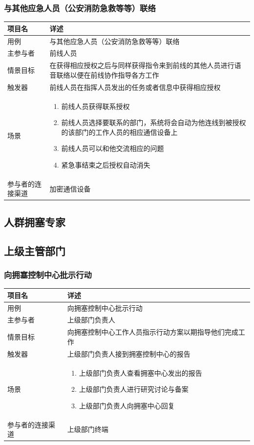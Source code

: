 \documentclass{ctexrep}
\begin{document}
\subsubsection{与其他应急人员（公安消防急救等等）联络}
\begin{longtable}{p{2cm} | p{10cm}}
\hline
项目名 & 详述 \\
\hline
\hline
用例 & 与其他应急人员（公安消防急救等等）联络\\
\hline
主参与者 & 前线人员 \\
\hline
情景目标 &  在获得相应授权之后与同样获得指令来到前线的其他人员进行语音联络以便在前线协作指导各方工作\\
\hline
触发器 & 前线人员在指挥人员发出的任务或者信息中获得相应授权 \\
\hline
场景 & \begin{enumerate}
	\item 前线人员获得联系授权
	\item 前线人员选择要联系的部门，系统将会自动为他连线到被授权的该部门的工作人员的相应通信设备上
	\item 前线人员可以和他交流相应的问题
	\item 紧急事结束之后授权自动消失
\end{enumerate} \\
\hline
参与者的连接渠道 & 加密通信设备\\
\hline
\end{longtable}

\subsection{人群拥塞专家}
\subsection{上级主管部门}

\subsubsection{向拥塞控制中心批示行动}
\begin{longtable}{p{2cm} | p{10cm}}
\hline
项目名 & 详述 \\
\hline
\hline
用例 & 向拥塞控制中心批示行动 \\
\hline
主参与者 & 上级部门负责人 \\
\hline
情景目标 & 向拥塞控制中心工作人员指示行动方案以期指导他们完成工作  \\
\hline
触发器 & 上级部门负责人接到拥塞控制中心的报告 \\
\hline
场景 & \begin{enumerate}
	\item 上级部门负责人查看拥塞中心发出的报告
	\item 上级部门负责人进行研究讨论与备案
	\item 上级部门负责人向拥塞中心回复
\end{enumerate} \\
\hline
参与者的连接渠道 & 上级部门终端 \\
\hline
\end{longtable}
\end{document}
